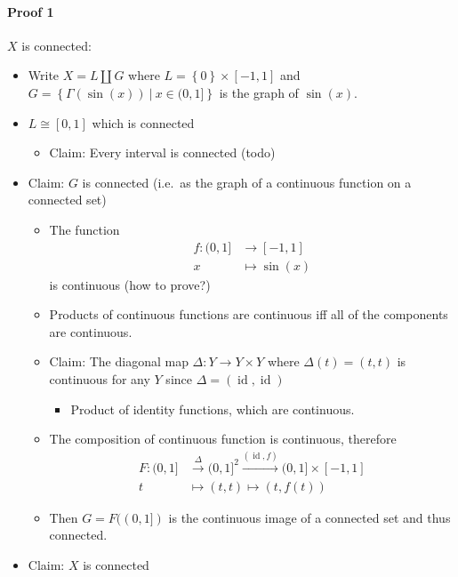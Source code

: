 \begin{solution}

\hfill

\begin{concept}

\hfill

\end{concept}

\hypertarget{proof-1-3}{%
\paragraph{Proof 1}\label{proof-1-3}}

\(X\) is connected:

\begin{itemize}
\tightlist
\item
  Write \(X = L{\coprod}G\) where
  \(L = \left\{{0}\right\} \times[-1, 1]\) and
  \(G = \left\{{\Gamma(\sin(x)) {~\mathrel{\Big|}~}x\in (0, 1]}\right\}\)
  is the graph of \(\sin(x)\).
\item
  \(L \cong [0, 1]\) which is connected

  \begin{itemize}
  \tightlist
  \item
    Claim: Every interval is connected (todo)
  \end{itemize}
\item
  Claim: \(G\) is connected (i.e.~as the graph of a continuous function
  on a connected set)

  \begin{itemize}
  \tightlist
  \item
    The function
    \begin{align*}     f: (0, 1] &\to [-1, 1] \\     x &\mapsto \sin(x)     \end{align*}
    is continuous (how to prove?)
  \item
    Products of continuous functions are continuous iff all of the
    components are continuous.
  \item
    Claim: The diagonal map \(\Delta: Y\to Y\times Y\) where
    \(\Delta(t) = (t, t)\) is continuous for any \(Y\) since
    \(\Delta = (\operatorname{id}, \operatorname{id})\)

    \begin{itemize}
    \tightlist
    \item
      Product of identity functions, which are continuous.
    \end{itemize}
  \item
    The composition of continuous function is continuous, therefore
    \begin{align*}     F : (0, 1] &\xrightarrow{\Delta} (0, 1]^2 \xrightarrow{(\operatorname{id}, f)} (0, 1] \times[-1, 1]  \\     t &\mapsto (t, t) \mapsto (t, f(t))     \end{align*}
  \item
    Then \(G = F((0, 1])\) is the continuous image of a connected set
    and thus connected.
  \end{itemize}
\item
  Claim: \(X\) is connected


\end{itemize}
\end{solution}

